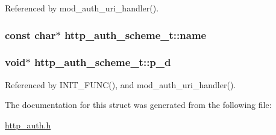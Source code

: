 Referenced by mod\-\_\-auth\-\_\-uri\-\_\-handler().

\hypertarget{structhttp__auth__scheme__t_ab3a76aa973d863c7f41adc0e54b77f53}{
\subsubsection[{name}]{\setlength{\rightskip}{0pt plus 5cm}const char$\ast$ http\-\_\-auth\-\_\-scheme\-\_\-t\-::name}}\label{structhttp__auth__scheme__t_ab3a76aa973d863c7f41adc0e54b77f53}
\hypertarget{structhttp__auth__scheme__t_a1c725453188cffd8054f97fcf7ef5a8b}{
\subsubsection[{p\-\_\-d}]{\setlength{\rightskip}{0pt plus 5cm}void$\ast$ http\-\_\-auth\-\_\-scheme\-\_\-t\-::p\-\_\-d}}\label{structhttp__auth__scheme__t_a1c725453188cffd8054f97fcf7ef5a8b}


Referenced by I\-N\-I\-T\-\_\-\-F\-U\-N\-C(), and mod\-\_\-auth\-\_\-uri\-\_\-handler().



The documentation for this struct was generated from the following file\-:\begin{DoxyCompactItemize}
\item 
\hyperlink{http__auth_8h}{http\-\_\-auth.\-h}\end{DoxyCompactItemize}
